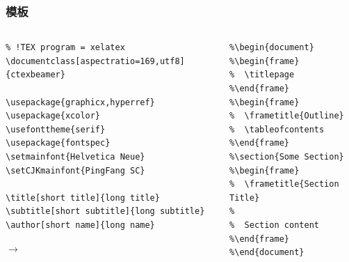 \documentclass[aspectratio=1610,utf8]{beamer}
\begin{document}
\begin{frame}[fragile]
  \frametitle{模板}

  \begin{columns}[t]
    \begin{column}{.5\textwidth}
      \scriptsize
\begin{verbatim}
% !TEX program = xelatex
\documentclass[aspectratio=169,utf8]{ctexbeamer}

\usepackage{graphicx,hyperref}
\usepackage{xcolor}
\usefonttheme{serif}
\usepackage{fontspec}
\setmainfont{Helvetica Neue}
\setCJKmainfont{PingFang SC}

\title[short title]{long title}
\subtitle[short subtitle]{long subtitle}
\author[short name]{long name}
\end{verbatim}

      $\longrightarrow$
      
    \end{column}

    \begin{column}{.35\textwidth}
      \scriptsize
\begin{verbatim}
%\begin{document}
%\begin{frame}
%  \titlepage
%\end{frame}
%\begin{frame}
%  \frametitle{Outline}
%  \tableofcontents
%\end{frame}
%\section{Some Section}
%\begin{frame}
%  \frametitle{Section Title}
%
%  Section content
%\end{frame}
%\end{document}
\end{verbatim}
      
    \end{column}
    
  \end{columns}

\end{frame}
\end{document}
